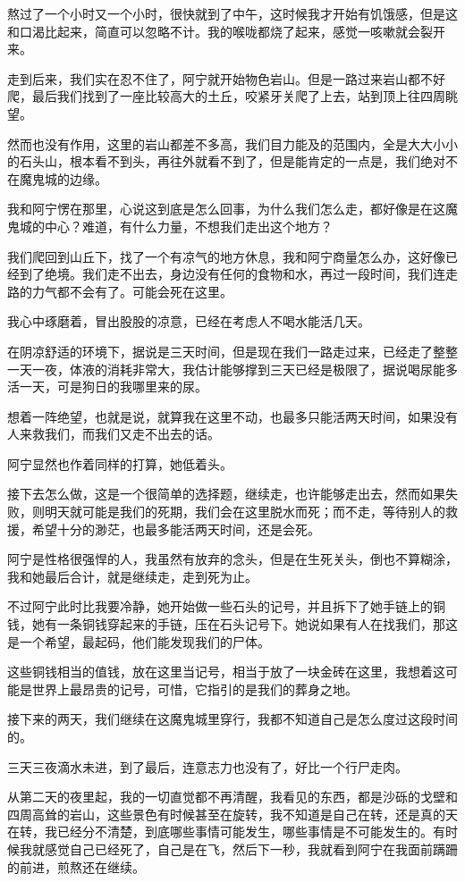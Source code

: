 熬过了一个小时又一个小时，很快就到了中午，这时候我才开始有饥饿感，但是这和口渴比起来，简直可以忽略不计。我的喉咙都烧了起来，感觉一咳嗽就会裂开来。

走到后来，我们实在忍不住了，阿宁就开始物色岩山。但是一路过来岩山都不好爬，最后我们找到了一座比较高大的土丘，咬紧牙关爬了上去，站到顶上往四周眺望。

然而也没有作用，这里的岩山都差不多高，我们目力能及的范围内，全是大大小小的石头山，根本看不到头，再往外就看不到了，但是能肯定的一点是，我们绝对不在魔鬼城的边缘。

我和阿宁愣在那里，心说这到底是怎么回事，为什么我们怎么走，都好像是在这魔鬼城的中心？难道，有什么力量，不想我们走出这个地方？

我们爬回到山丘下，找了一个有凉气的地方休息，我和阿宁商量怎么办，这好像已经到了绝境。我们走不出去，身边没有任何的食物和水，再过一段时间，我们连走路的力气都不会有了。可能会死在这里。

我心中琢磨着，冒出股股的凉意，已经在考虑人不喝水能活几天。

在阴凉舒适的环境下，据说是三天时间，但是现在我们一路走过来，已经走了整整一天一夜，体液的消耗非常大，我估计能够撑到三天已经是极限了，据说喝尿能多活一天，可是狗日的我哪里来的尿。

想着一阵绝望，也就是说，就算我在这里不动，也最多只能活两天时间，如果没有人来救我们，而我们又走不出去的话。

阿宁显然也作着同样的打算，她低着头。

接下去怎么做，这是一个很简单的选择题，继续走，也许能够走出去，然而如果失败，则明天就可能是我们的死期，我们会在这里脱水而死；而不走，等待别人的救援，希望十分的渺茫，也最多能活两天时间，还是会死。

阿宁是性格很强悍的人，我虽然有放弃的念头，但是在生死关头，倒也不算糊涂，我和她最后合计，就是继续走，走到死为止。

不过阿宁此时比我要冷静，她开始做一些石头的记号，并且拆下了她手链上的铜钱，她有一条铜钱穿起来的手链，压在石头记号下。她说如果有人在找我们，那这是一个希望，最起码，他们能发现我们的尸体。

这些铜钱相当的值钱，放在这里当记号，相当于放了一块金砖在这里，我想着这可能是世界上最昂贵的记号，可惜，它指引的是我们的葬身之地。

接下来的两天，我们继续在这魔鬼城里穿行，我都不知道自己是怎么度过这段时间的。

三天三夜滴水未进，到了最后，连意志力也没有了，好比一个行尸走肉。

从第二天的夜里起，我的一切直觉都不再清醒，我看见的东西，都是沙砾的戈壁和四周高耸的岩山，这些景色有时候甚至在旋转，我不知道是自己在转，还是真的天在转，我已经分不清楚，到底哪些事情可能发生，哪些事情是不可能发生的。有时候我就感觉自己已经死了，自己是在飞，然后下一秒，我就看到阿宁在我面前蹒跚的前进，煎熬还在继续。

